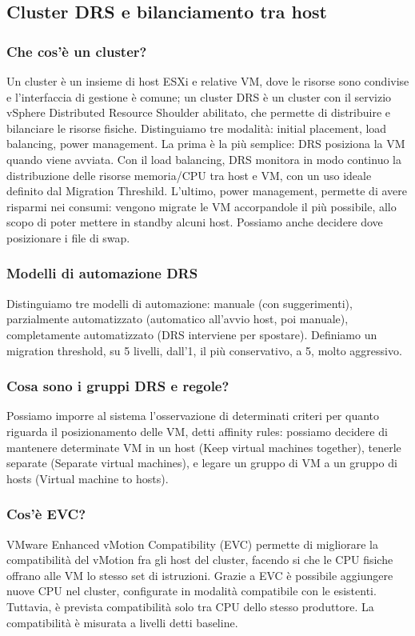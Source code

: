 \documentclass[11pt]{article}
\begin{document}
\subsection{Cluster DRS e bilanciamento tra host}
\subsubsection{Che cos'è un cluster?}
Un cluster è un insieme di host ESXi e relative VM, dove le risorse sono condivise e l'interfaccia di gestione è comune; un cluster DRS è un cluster con il servizio vSphere Distributed Resource Shoulder abilitato, che permette di distribuire e bilanciare le risorse fisiche. Distinguiamo tre modalità: initial placement, load balancing, power management. La prima è la più semplice: DRS posiziona la VM quando viene avviata. Con il load balancing, DRS monitora in modo continuo la distribuzione delle risorse memoria/CPU tra host e VM, con un uso ideale definito dal Migration Threshild. L'ultimo, power management, permette di avere risparmi nei consumi: vengono migrate le VM accorpandole il più possibile, allo scopo di poter mettere in standby alcuni host. Possiamo anche decidere dove posizionare i file di swap.

\subsubsection{Modelli di automazione DRS}
Distinguiamo tre modelli di automazione: manuale (con suggerimenti), parzialmente automatizzato (automatico all'avvio host, poi manuale), completamente automatizzato (DRS interviene per spostare). Definiamo un migration threshold, su 5 livelli, dall'1, il più conservativo, a 5, molto aggressivo. 

\subsubsection{Cosa sono i gruppi DRS e regole?}
Possiamo imporre al sistema l'osservazione di determinati criteri per quanto riguarda il posizionamento delle VM, detti affinity rules: possiamo decidere di mantenere determinate VM in un host (Keep virtual machines together), tenerle separate (Separate virtual machines), e legare un gruppo di VM a un gruppo di hosts (Virtual machine to hosts). 

\subsubsection{Cos'è EVC?}
VMware Enhanced vMotion Compatibility (EVC) permette di migliorare la compatibilità del vMotion fra gli host del cluster, facendo si che le CPU fisiche offrano alle VM lo stesso set di istruzioni. Grazie a EVC è possibile aggiungere nuove CPU nel cluster, configurate in modalità compatibile con le esistenti. Tuttavia, è prevista compatibilità solo tra CPU dello stesso produttore. La compatibilità è misurata a livelli detti baseline. 
\end{document}
